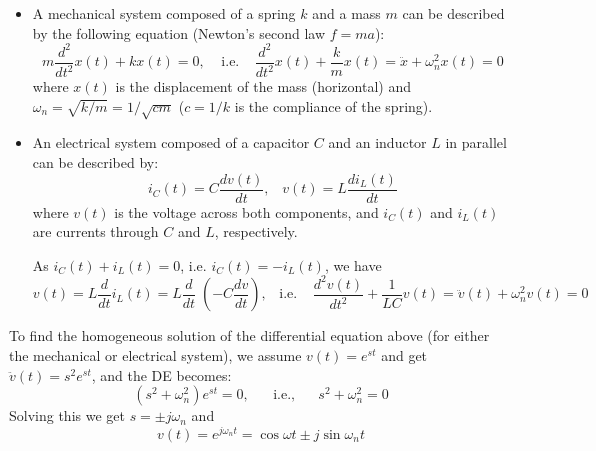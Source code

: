 \documentclass{article}
\begin{document}
\begin{itemize}
\item A mechanical system composed of a spring $k$ and a mass $m$ can be 
  described by the following equation (Newton's second law $f=ma$):
  \begin{equation} 
    m\frac{d^2}{dt^2}x(t)+kx(t)=0,\;\;\;\;\mbox{i.e.}\;\;\;\;
    \frac{d^2}{dt^2}x(t)+\frac{k}{m}x(t)=\ddot{x}+\omega_n^2 x(t)=0	
  \end{equation}
  where $x(t)$ is the displacement of the mass (horizontal) and 
  $\omega_n=\sqrt{k/m}=1/\sqrt{cm}$ ($c=1/k$ is the compliance of the spring).

\item An electrical system composed of a capacitor $C$ and an inductor $L$
  in parallel can be described by:
  \begin{equation}	
    i_C(t)=C\frac{dv(t)}{dt},\;\;\;v(t)=L\frac{di_L(t)}{dt}	
  \end{equation}
  where $v(t)$ is the voltage across both components, and $i_C(t)$ and $i_L(t)$
  are currents through $C$ and $L$, respectively. 


  As $i_C(t)+i_L(t)=0$, i.e. $i_C(t)=-i_L(t)$, we have
  \begin{equation}
    v(t)=L\frac{d}{dt}i_L(t)=L\frac{d}{dt}\;(-C\frac{dv}{dt}),\;\;\;
    \mbox{i.e.}\;\;\;\;\frac{d^2v(t)}{dt^2}+\frac{1}{LC}v(t)
    =\ddot{v}(t)+\omega_n^2 v(t)=0	
  \end{equation}

\end{itemize}

To find the homogeneous solution of the differential equation above 
(for either the mechanical or electrical system), we assume $v(t)=e^{st}$ 
and get $\ddot{v}(t)=s^2 e^{st}$, and the DE becomes:
\begin{equation}
  (s^2+\omega_n^2) e^{st}=0,\;\;\;\;\;\;\mbox{i.e.,}\;\;\;\;\;\;
  s^2+\omega_n^2=0 
\end{equation}
Solving this we get $s=\pm j\omega_n$ and 
\begin{equation}
  v(t)=e^{j\omega_n t}=\cos \omega t\pm j\sin \omega_n t 
\end{equation}
\end{document}
